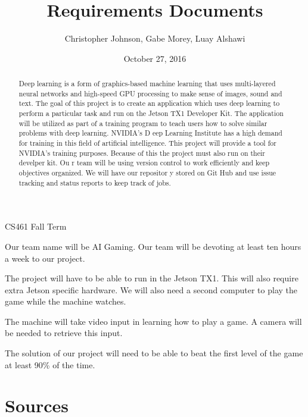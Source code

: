 \documentclass[letterpaper,10pt]{article}
\author{Christopher Johnson, Gabe Morey, Luay Alshawi}
\title{Requirements Documents}
\date{October 27, 2016}
\begin{document}
\begin{titlingpage}
\maketitle
CS461 Fall Term

\begin{abstract}
Deep learning is a form of graphics-based machine learning that uses multi-layered neural networks and high-speed 
GPU processing to make sense of images, sound and text. The goal of this project is to create an application which
 uses deep learning to perform a particular task and run on the Jetson TX1 Developer Kit. The application will be 
utilized as part of a training program to teach users how to solve similar problems with deep learning. NVIDIA's D
eep Learning Institute has a high demand for training in this field of artificial intelligence. This project will 
provide a tool for NVIDIA's training purposes. Because of this the project must also run on their develper kit. Ou
r team will be using version control to work efficiently and keep objectives organized. We will have our repositor
y stored on Git Hub and use issue tracking and status reports to keep track of jobs.
\end{abstract}

\end{titlingpage}
Our team name will be AI Gaming.
Our team will be devoting at least ten hours a week to our project. 

The project will have to be able to run in the Jetson TX1. This will also require extra Jetson specific hardware.
We will also need a second computer to play the game while the machine watches.

The machine will take video input in learning how to play a game. A camera will be needed to retrieve this input. 

The solution of our project will need to be able to beat the first level of the game at least 90\% of the time. 

\section{Sources}
\end{document}
